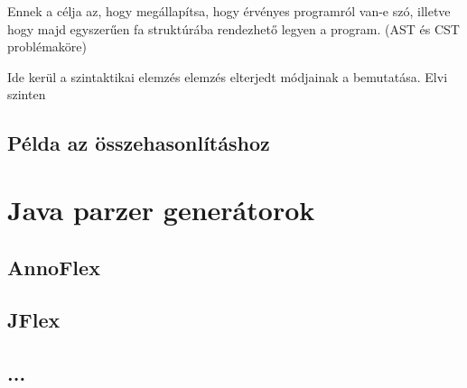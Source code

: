 


Ennek a célja az, hogy megállapítsa, hogy érvényes programról van-e szó, illetve hogy majd egyszerűen fa struktúrába rendezhető legyen a program. (AST és CST problémaköre)

Ide kerül a szintaktikai elemzés elemzés elterjedt módjainak a bemutatása. Elvi szinten

\subsection{Példa az összehasonlításhoz}




\section{Java parzer generátorok}


\subsection{AnnoFlex}


\subsection{JFlex}


\subsection{...}

